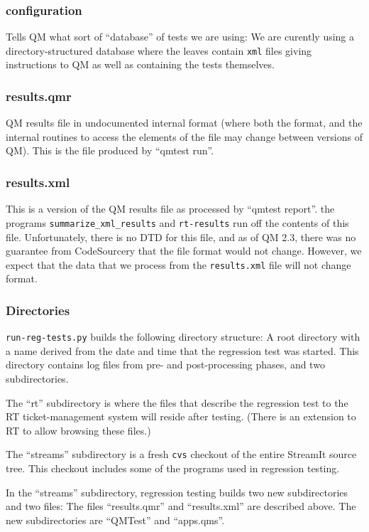 \documentclass[11pt]{article}
\begin{document}
\subsubsection{configuration}
Tells QM what sort of ``database'' of tests we are using:  We are curently
using a directory-structured database where the leaves contain {\tt  xml} 
files giving instructions to QM as well as containing the tests themselves.

\subsubsection{results.qmr}
QM results file in undocumented internal format (where both the
format, and the internal routines to access the elements of the file
may change between versions of QM).  This is the file produced by
``qmtest run''.

\subsubsection{results.xml}
This is a version of the QM results file as processed by ``qmtest report''.
the programs {\tt summarize_xml_results} and {\tt rt-results} run off
the contents of this file.
Unfortunately, there is no DTD for this file, and as of QM 2.3, there
was no guarantee from CodeSourcery that the file format would not
change.
However, we expect that the data that we process from the {\tt results.xml}
file will not change format.

\subsubsection{Directories}
{\tt run-reg-tests.py} builds the following directory structure:
A root directory with a name derived from the date and time that the
regression test was started.
This directory contains log files from pre- and post-processing
phases, and two subdirectories.

The ``rt'' subdirectory is where the files that describe the
regression test to the RT ticket-management system will reside after
testing. (There is an extension to RT to allow browsing these files.)

The ``streams'' subdirectory is a fresh {\tt cvs} checkout of the
entire StreamIt source tree.  This checkout includes some of the
programs used in regression testing.

In the ``streams'' subdirectory, regression testing builds two new
subdirectories and two files:  The files ``results.qmr'' and
``results.xml'' are described above.
The new subdirectories are ``QMTest'' and ``apps.qms''.
\end{document}
